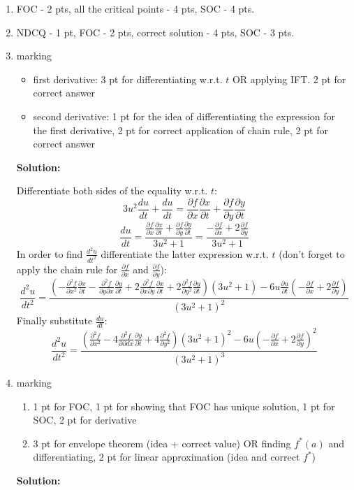 \begin{enumerate}
\item  FOC - 2 pts, all the critical points - 4 pts, SOC - 4 pts.
\item  NDCQ - 1 pt, FOC - 2 pts, correct solution - 4 pts, SOC - 3 pts.

\item marking
\begin{itemize}
\item first derivative: 3 pt for differentiating w.r.t. \(t\) OR applying IFT. 2 pt for correct answer
\item second derivative: 1 pt for the idea of differentiating the expression for the first derivative, 2 pt for correct application of chain rule, 2 pt for correct answer
\end{itemize}
\textbf{Solution:}

Differentiate both sides of the equality w.r.t. \(t\):
\[
3u^2 \frac{du}{dt} + \frac{du}{dt} = \frac{\partial f}{\partial x}\frac{\partial x}{\partial t}+\frac{\partial f}{\partial y}\frac{\partial y}{\partial t}
\]
\[
\frac{du}{dt} = \frac{\frac{\partial f}{\partial x}\frac{\partial x}{\partial t}+\frac{\partial f}{\partial y}\frac{\partial y}{\partial t}}{3u^2+1} = \frac{-\frac{\partial f}{\partial x}+2\frac{\partial f}{\partial y}}{3u^2+1}
\]
In order to find \(\frac{d^2u}{dt^2}\) differentiate the latter expression w.r.t.  \(t\) (don't forget to apply the chain rule for \(\frac{\partial f}{\partial x}\) and \(\frac{\partial f}{\partial y}\)):
\[
\frac{d^2u}{dt^2} = \frac{(-\frac{\partial ^2f}{\partial x^2}\frac{\partial x}{\partial t}-\frac{\partial ^2f}{\partial y\partial x}\frac{\partial y}{\partial t} + 2\frac{\partial ^2f}{\partial x\partial y}\frac{\partial x}{\partial t}+2\frac{\partial ^2f}{\partial y^2}\frac{\partial y}{\partial t})(3u^2+1) -
6u\frac{\partial u}{\partial t}(-\frac{\partial f}{\partial x}+2\frac{\partial f}{\partial y})}
{(3u^2+1)^2}
\]
Finally substitute \(\frac{du}{dt}\):
\[
\frac{d^2u}{dt^2} = \frac{(\frac{\partial ^2f}{\partial x^2}-4\frac{\partial ^2f}{\partial \partial dx}\frac{\partial y}{\partial t} + 4\frac{\partial ^2f}{\partial y^2})(3u^2+1)^2 -
6u(-\frac{\partial f}{\partial x}+2\frac{\partial f}{\partial y})^2}
{(3u^2+1)^3}
\]

\item marking
\begin{enumerate}
\item 1 pt for FOC, 1 pt for showing that FOC has unique solution, 1 pt for SOC, 2 pt for derivative
\item 3 pt for envelope theorem (idea + correct value) OR finding \(f^*(a)\) and differentiating, 2 pt for linear approximation (idea and correct \(f^*\))
\end{enumerate}
\textbf{Solution:}


\end{enumerate}
